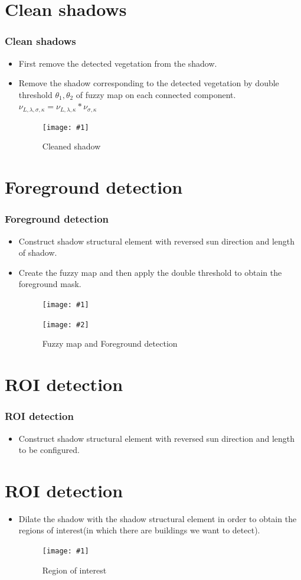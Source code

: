 \documentclass[compress]{beamer} %
\newcommand{\insertTwoF}[4]{
  \begin{figure}[h!]
    \centering
    \begin{minipage}{#4\linewidth}
    \texttt{[image: \#1]}
    \end{minipage}
    \begin{minipage}{#4\linewidth}
    \texttt{[image: \#2]}
    \end{minipage}
      \caption{#3}
  \end{figure}  
}
\newcommand{\insertF}[3]{
  \begin{figure}[h!]
    \centering
    \begin{minipage}{#3\linewidth}
    \texttt{[image: \#1]}
    \end{minipage}  
      \caption{#2}
  \end{figure}  
}
\begin{document}
  \section{Clean shadows}
\begin{frame}
  \frametitle{Clean shadows}
  \begin{itemize}
   \item First remove the detected vegetation from the shadow.
   \item Remove the shadow corresponding to the detected vegetation by double threshold $\theta_1, \theta_2$ of fuzzy map on each connected component. 
   $\nu_{L,\lambda,\sigma,\kappa}=\nu_{L,\lambda,\kappa}*\nu_{\sigma,\kappa}$
   \insertF{cleaned_shadow}{Cleaned shadow}{0.5}
  \end{itemize}
 \end{frame} 
 
 \section{Foreground detection}
\begin{frame}
  \frametitle{Foreground detection}
    
  \begin{itemize}
   \item Construct shadow structural element with reversed sun direction and length of shadow.
   
   \item Create the fuzzy map and then apply the double threshold to obtain the foreground mask.
   \insertTwoF{fuzzy_map}{fore-back}{Fuzzy map and Foreground detection}{0.4}
  \end{itemize}
 \end{frame} 
 
 
 \section{ROI detection}
\begin{frame}
  \frametitle{ROI detection}
    
  \begin{itemize}
   \item Construct shadow structural element with reversed sun direction and length to be configured.
   \end{itemize}
 \end{frame} 
 
   \section{ROI detection}
\begin{frame}
\begin{itemize}
  \frametitle{ROI detection}
   \item Dilate the shadow with the shadow structural element in order to obtain the regions of interest(in which there are buildings we want to detect).
   \insertF{ROI}{Region of interest}{0.8}
  \end{itemize}
 \end{frame} 
 
\end{document}
